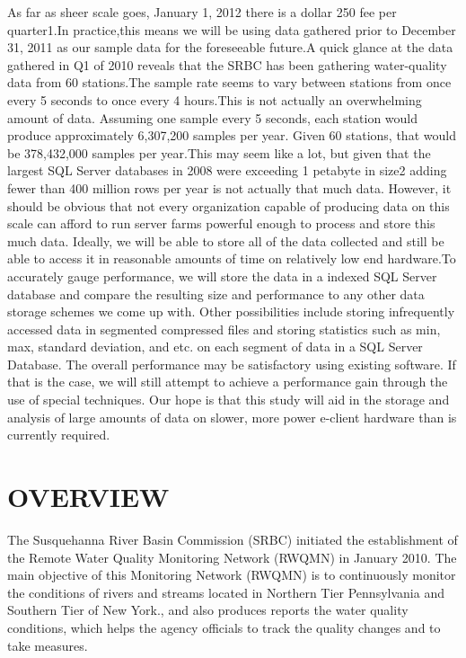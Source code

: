 \documentclass[a4paper]{article}
\begin{document}
\begin{minipage}[t]{0.45\textwidth}
{\normalsize  As far as sheer scale goes, January 1, 2012 there is a  dollar 250 fee per quarter1.In practice,this means we will be using data gathered prior to December 31, 2011 as our sample data for the foreseeable future.A quick glance at the data gathered in Q1 of 2010 reveals that the SRBC has been gathering water-quality data from 60 stations.The sample rate seems to vary between stations from once every 5 seconds to once every 4 hours.This is not actually an overwhelming amount of data. Assuming one sample every 5 seconds, each station would produce approximately 6,307,200 samples per year. Given 60 stations, that would be 378,432,000 samples per year.This may seem like a lot, but given that the largest SQL Server databases in 2008 were exceeding 1 petabyte in size2 adding fewer than 400 million rows per year is not actually that much data. However, it should be obvious that not every organization capable of producing data on this scale can afford to run server farms powerful enough to process and store this much data. Ideally, we will be able to store all of the data collected and still be able to access it in reasonable amounts of time on relatively low end hardware.To accurately gauge performance, we will store the data in a indexed SQL Server database and compare the resulting size and performance to any other data storage schemes we come up with. Other possibilities include storing infrequently accessed data in segmented compressed files and storing statistics such as min, max, standard deviation, and etc. on each segment of data in a SQL Server Database. The overall performance may be satisfactory using existing software. If that is the case, we will still attempt to achieve a performance gain through the use of special techniques. Our hope is that this study will aid in the storage and analysis of large amounts of data on slower, more power e-client hardware than is currently required.}
\section*{OVERVIEW}{\normalsize The Susquehanna River Basin Commission (SRBC) initiated the establishment of the Remote Water Quality Monitoring Network (RWQMN) in January 2010.
The main objective of this Monitoring Network (RWQMN) is to continuously monitor the conditions of rivers and streams located in Northern Tier Pennsylvania and Southern Tier of New York., and also produces reports the water quality conditions, which helps the agency officials to track the quality changes and to take measures.}
\end{minipage} 
\end{document}
